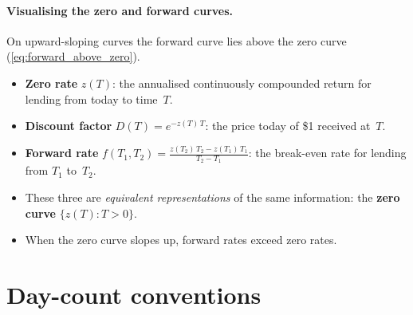 \paragraph{Visualising the zero and forward curves.}

\begin{center}
\end{center}

On upward-sloping curves the forward curve lies above the zero curve
(\cref{eq:forward_above_zero}).

\begin{keyfactbox}
\begin{itemize}
  \item \textbf{Zero rate} $z(T)$: the annualised continuously
    compounded return for lending from today to time~$T$.
  \item \textbf{Discount factor} $D(T) = e^{-z(T)\,T}$: the price
    today of \$1 received at~$T$.
  \item \textbf{Forward rate}
    $f(T_1,T_2) = \frac{z(T_2)\,T_2 - z(T_1)\,T_1}{T_2 - T_1}$:
    the break-even rate for lending from $T_1$ to~$T_2$.
  \item These three are \emph{equivalent representations} of the
    same information: the \textbf{zero curve}
    $\{z(T) : T > 0\}$.
  \item When the zero curve slopes up, forward rates exceed zero
    rates.
\end{itemize}
\end{keyfactbox}


\section{Day-count conventions}
\label{sec:fi_daycount}


